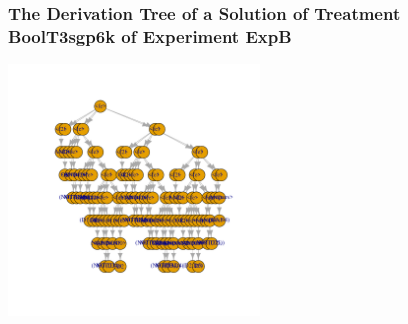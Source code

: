  \begin{frame}
 \frametitle{ The Derivation Tree of a Solution of Treatment BoolT3sgp6k of Experiment ExpB }
 \begin{center}
\includegraphics[width=0.5\textwidth, angle=0]
{ExpBDerivationTreeFigure019.pdf}
 \end{center}
 \label{report/ExpBDerivationTreeFigure019.pdf}  
 \end{frame}

